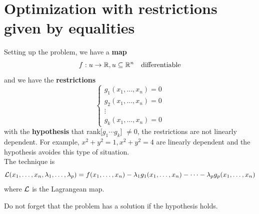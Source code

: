 \section{Optimization with restrictions given by equalities}

Setting up the problem, we have a \textbf{map}
\begin{equation*}
    f: u\to\mathbb{R}, u\subseteq\mathbb{R}^n \quad\text{differentiable}
\end{equation*}
and we have the \textbf{restrictions}
\begin{equation*}
    \begin{cases*}
        g_1(x_1,\ldots,x_n) = 0\\
        g_2(x_1,\ldots,x_n) = 0\\
        \vdots\\
        g_k(x_1,\ldots,x_n) = 0
    \end{cases*}
\end{equation*}
with the \textbf{hypothesis} that rank[$g_1 \cdots g_k$] $\neq 0$, the restrictions are not linearly dependent. 
For example, $x^2 + y^2 = 1, x^2 + y^2 = 4$ are linearly dependent and the hypothesis avoides this type of situation.\\

The technique is
\begin{equation*}
    \mathcal{L}(x_1,\ldots,x_n,\lambda_1,\ldots,\lambda_p) = f(x_1,\ldots,x_n)-\lambda_1g_1(x_1,\ldots,x_n)-\cdots -\lambda_pg_p(x_1,\ldots,x_n)
\end{equation*}
where $\mathcal{L}$ is the Lagrangean map.

Do not forget that the problem has a solution if the hypothesis holds.

